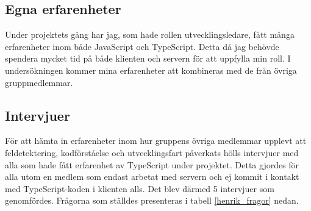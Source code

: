 \subsection{Egna erfarenheter}
Under projektets gång har jag, som hade rollen utvecklingsledare, fått många erfarenheter inom både JavaScript och TypeScript. Detta då jag behövde spendera mycket tid på både klienten och servern för att uppfylla min roll. I undersökningen kommer mina erfarenheter att kombineras med de från övriga gruppmedlemmar.

\subsection{Intervjuer}
För att hämta in erfarenheter inom hur gruppens övriga medlemmar upplevt att feldetektering, kodförståelse och utvecklingsfart påverkats hölls intervjuer med alla som hade fått erfarenhet av TypeScript under projektet. Detta gjordes för alla utom en medlem som endast arbetat med servern och ej kommit i kontakt med TypeScript-koden i klienten alls. Det blev därmed 5 intervjuer som genomfördes. Frågorna som ställdes presenteras i tabell \ref{henrik_fragor} nedan.

